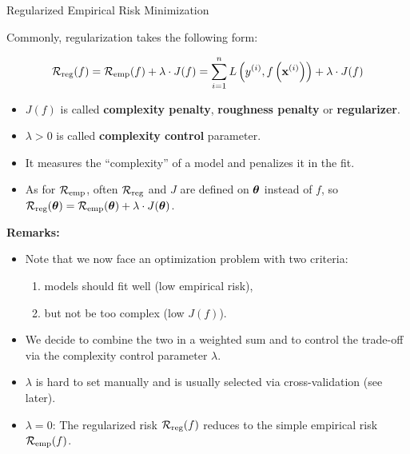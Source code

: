 \documentclass[11pt,compress,t,notes=noshow, xcolor=table]{beamer}
\begin{document}
\begin{vbframe}{Regularized Empirical Risk Minimization}

  Commonly, regularization takes the following form:
  
  $$
  \mathcal{R}_{\text{reg}}(f) = \mathcal{R}_{\text{emp}}(f) + \lambda \cdot J(f) = \sum\limits_{i=1}^n L\left(y^{(i)}, f\left(\mathbf{x}^{(i)}\right)\right) + \lambda \cdot J(f)
  $$
\begin{itemize}

  \item $J(f)$ is called \textbf{complexity penalty}, \textbf{roughness penalty} or \textbf{regularizer}.
  \item $\lambda > 0$ is called \textbf{complexity control} parameter. 
  \item It measures the \enquote{complexity} of a model and penalizes it in the fit.
  \item As for $\mathcal{R}_{\text{emp}}$, often $\mathcal{R}_{\text{reg}}$ and $J$ are defined on $\bm{\theta}$ instead of $f$, so $\mathcal{R}_{\text{reg}}(\bm{\theta}) = \mathcal{R}_{\text{emp}}(\bm{\theta}) + \lambda \cdot J(\bm{\theta})$. 
\end{itemize}

\framebreak

\textbf{Remarks:}

\begin{itemize}
  \item Note that we now face an optimization problem with two criteria: 
    \begin{enumerate}
      \item models should fit well (low empirical risk),
      \item but not be too complex (low $J(f)$). 
    \end{enumerate}
  \item We decide to combine the two in a weighted sum and to control
  the trade-off via the complexity control parameter $\lambda$.
  \item $\lambda$ is hard to set manually and is usually selected via cross-validation (see later).
  \item $\lambda = 0$: The regularized risk $\mathcal{R}_{\text{reg}}(f)$ reduces to the simple empirical risk $\mathcal{R}_{\text{emp}}(f)$.


\end{itemize}
\end{vbframe}
\end{document}
